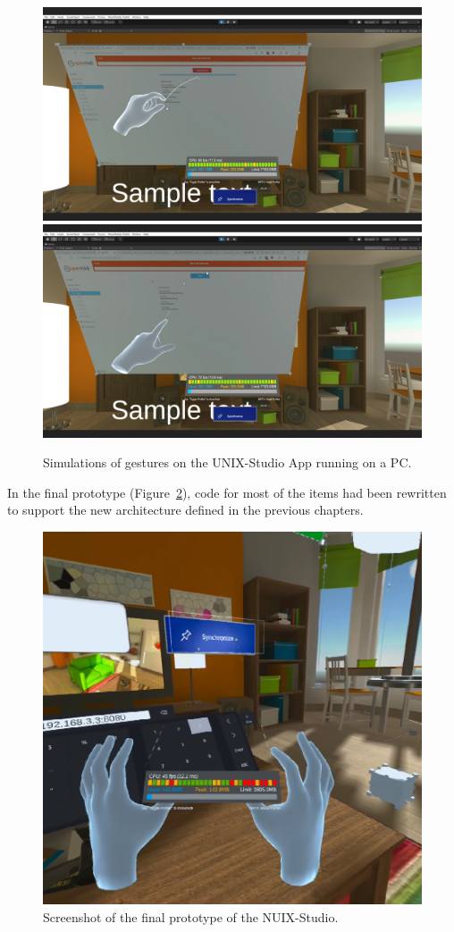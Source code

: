 \begin{figure}
  \centering
    {\includegraphics[width=0.45\linewidth]{figures/InputSimulation1.png}}
    {\includegraphics[width=0.45\linewidth]{figures/InputSimulation2.png}}
  \caption{Simulations of gestures on the UNIX-Studio App running on a PC.}
  \label{fig:InputSimulation-figure}
\end{figure}

In the final prototype (Figure~\ref{fig:FinalPrototype-figure}), code for most of the items had been rewritten to support the new architecture defined in the previous chapters. 


\begin{figure}
  \centering
  \includegraphics[width=0.6\linewidth]{figures/FinalPrototype.png}
  \caption{Screenshot of the final prototype of the NUIX-Studio.}
  \label{fig:FinalPrototype-figure}
\end{figure}